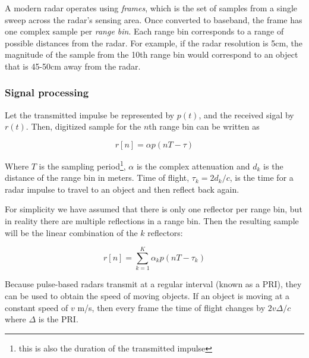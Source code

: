 \documentclass[12pt]{article}
\begin{document}


A modern radar operates using \emph{frames}, which is the set of
samples from a single sweep across the radar's sensing area. Once
converted to baseband, the frame has one complex sample per
\emph{range bin}. Each range bin corresponds to a range of possible
distances from the radar. For example, if the radar resolution is 5cm,
the magnitude of the sample from the 10th range bin would correspond
to an object that is 45-50cm away from the radar.

\subsubsection*{Signal processing}

Let the transmitted impulse be represented by $p(t)$, and the received
sigal by $r(t)$. Then, digitized sample for the $n$th range bin can be
written as

\begin{equation}
r[n] = \alpha p(nT - \tau)  
\end{equation}

Where $T$ is the sampling period\footnote{this is also the duration of
  the transmitted impulse}, $\alpha$ is the complex attenuation and
$d_k$ is the distance of the range bin in meters. Time of flight,
$\tau_k = 2d_k/c$, is the time for a radar impulse to travel to an object and
then reflect back again. 

For simplicity we have assumed that there is only one reflector per
range bin, but in reality there are multiple reflections in a range
bin. Then the resulting sample will be the linear combination of the
$k$ reflectors:

\begin{equation}
r[n] = \sum\limits_{k=1}^K \alpha_k p(nT - \tau_k)  
\end{equation}

Because pulse-based radars transmit at a regular interval (known as a
PRI), they can be used to obtain the speed of moving objects. If an
object is moving at a constant speed of $v$ m/s, then every frame the
time of flight changes by $2v\Delta/c$ where $\Delta$ is the PRI.
\end{document}
